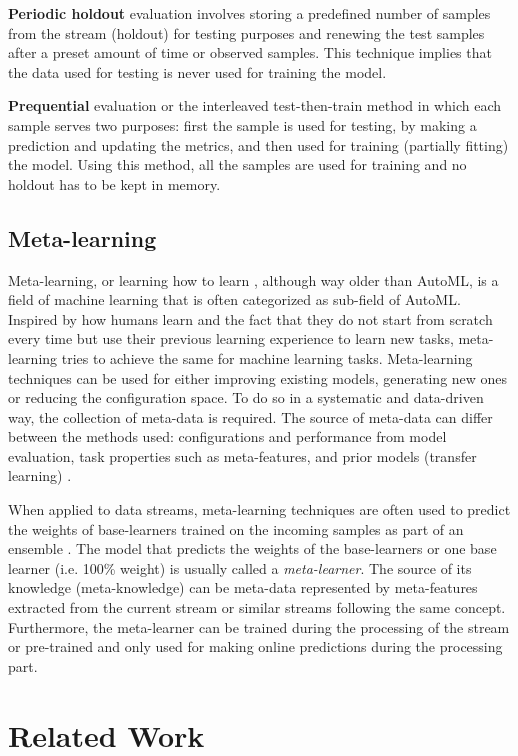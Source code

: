 \documentclass{sig-alternate-br}
\begin{document}
\textbf{Periodic holdout} evaluation involves storing a predefined number of samples from the stream (holdout) for testing purposes and renewing the test samples after a preset amount of time or observed samples. This technique implies that the data used for testing is never used for training the model.

\textbf{Prequential} evaluation or the interleaved test-then-train method in which each sample serves two purposes: first the sample is used for testing, by making a prediction and updating the metrics, and then used for training (partially fitting) the model. Using this method, all the samples are used for training and no holdout has to be kept in memory.

\subsection{Meta-learning}

Meta-learning, or learning how to learn \cite{vanschoren2018meta}, although way older than AutoML, is a field of machine learning that is often categorized as sub-field of AutoML. Inspired by how humans learn and the fact that they do not start from scratch every time but use their previous learning experience to learn new tasks, meta-learning tries to achieve the same for machine learning tasks. Meta-learning techniques can be used for either improving existing models, generating new ones or reducing the configuration space. To do so in a systematic and data-driven way, the collection of meta-data is required. The source of meta-data can differ between the methods used: configurations and performance from model evaluation, task properties such as meta-features, and prior models (transfer learning) \cite{vanschoren2014openml}.

When applied to data streams, meta-learning techniques are often used to predict the weights of base-learners trained on the incoming samples as part of an ensemble \cite{van2018online}. The model that predicts the weights of the base-learners or one base learner (i.e. 100\% weight) is usually called a \emph{meta-learner}. The source of its knowledge (meta-knowledge) can be meta-data represented by meta-features \cite{rossi2017guidance} extracted from the current stream or similar streams following the same concept. Furthermore, the meta-learner can be trained during the processing of the stream or pre-trained and only used for making online predictions during the processing part.

\section{Related Work}
\label{relatedwork}
\end{document}
